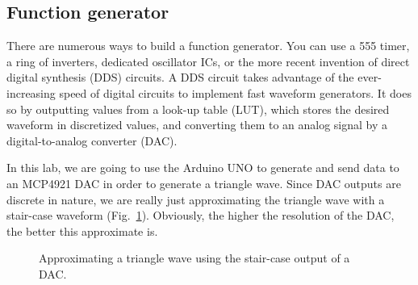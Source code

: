 \documentclass[letterpaper, 11pt]{article}
\begin{document}
\subsection{Function generator}

There are numerous ways to build a function generator. You can use a 555 timer, a ring of inverters, dedicated oscillator ICs, or the more recent invention of direct digital synthesis (DDS) circuits. A DDS circuit takes advantage of the ever-increasing speed of digital circuits to implement fast waveform generators. It does so by outputting values from a look-up table (LUT), which stores the desired waveform in discretized values, and converting them to an analog signal by a digital-to-analog converter (DAC). 

In this lab, we are going to use the Arduino UNO to generate and send data to an MCP4921 DAC in order to generate a triangle wave. Since DAC outputs are discrete in nature, we are really just approximating the triangle wave with a stair-case waveform (Fig.~\ref{fig:tri_dac}). Obviously, the higher the resolution of the DAC, the better this approximate is. 

\begin{figure}[h]
	\caption{Approximating a triangle wave using the stair-case output of a DAC.}
	\label{fig:tri_dac}
\end{figure}
\end{document}
